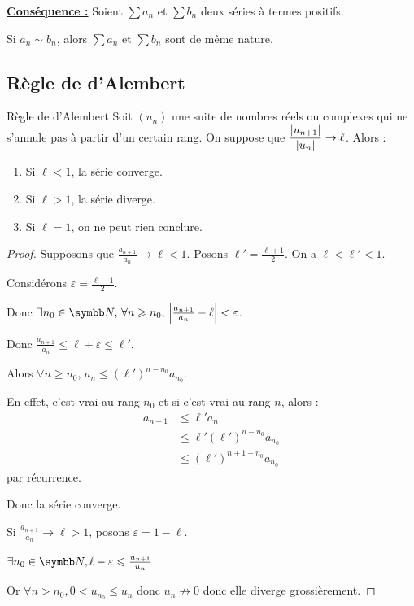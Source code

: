 \uline{\textbf{Conséquence :}} Soient $\sum a_n$ et $\sum b_n$ deux séries à termes positifs.

Si $a_n \sim b_n$, alors $\sum a_n$ et $\sum b_n$ sont de même nature.

\subsection{Règle de d'Alembert}

\begin{theoreme}{Règle de d'Alembert}{}
    Soit $(u_n)$ une suite de nombres réels ou complexes qui ne s'annule pas 
    à partir d'un certain rang. On suppose que $\displaystyle \frac{|u_{n + 1}|}{|u_n|} \to \ell$.
    Alors : 
    \begin{enumerate}
        \item Si $\ell < 1$, la série converge.
        \item Si $\ell > 1$, la série diverge.
        \item Si $\ell = 1$, on ne peut rien conclure.
    \end{enumerate}
\end{theoreme}


\begin{proof}
    Supposons que $\frac{a_{n + 1 }}{a_n } \longrightarrow \ell < 1$. Posons $\ell' = \frac {\ell+1} 2$. On a $\ell < \ell' < 1$.

    Considérons $\varepsilon = \frac{\ell - 1 } 2 $.

    Donc $\exists n_0 \in \N, \, \forall n \geqslant n_0, \, \abs{\frac{a_{n + 1}}{a_n} - \ell} < \varepsilon$.

    Donc $\frac{a_{n + 1}}{a_n} \leqslant \ell + \varepsilon \leqslant \ell'$.

    Alors $\displaystyle \forall n \geqslant n_0$, $\displaystyle a_n \leqslant (\ell')^{n-n_0} a_{n_0}$.

    En effet, c'est vrai au rang $n_0$ et si c'est vrai au rang $n$, 
    alors :
    \begin{align*}
        a_{n + 1} & \leqslant \ell' a_n \\
                  & \leqslant \ell' (\ell')^{n - n_0} a_{n_0} \\
                  & \leqslant (\ell')^{n + 1 - n_0} a_{n_0}
    \end{align*} par récurrence. 

    Donc la série converge.

    Si $\frac{a_{n + 1}}{a_n} \to \ell > 1$, posons $\varepsilon = 1 - \ell$.

    $\exists n_0 \in \N, \ell - \varepsilon \leqslant \frac {u_{n+1}} {u_n}$

    Or $\forall n > n_0, 0 < u_{n_0} \leqslant u_n$  donc $u_n \not \to 0$ donc elle diverge grossièrement.
\end{proof}

